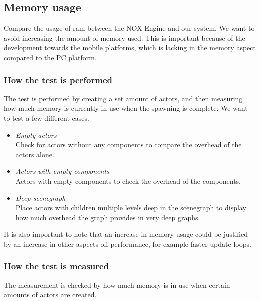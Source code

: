 \subsection{Memory usage}
Compare the usage of ram between the NOX-Engine and our system.
We want to avoid increasing the amount of memory used.
This is important because of the development towards the mobile platforms, which is lacking in the memory aspect compared to the PC platform.

\subsubsection*{How the test is performed}
The test is performed by creating a set amount of actors, and then measuring how much memory is currently in use when the spawning is complete.
We want to test a few different cases.

\begin{itemize}

    \item\noindent\textit{Empty actors}\\
    Check for actors without any components to compare the overhead of the actors alone.

    \item\noindent\textit{Actors with empty components}\\
    Actors with empty components to check the overhead of the components.

    \item\noindent\textit{Deep scenegraph}\\
    Place actors with children multiple levels deep in the scenegraph to display how much overhead the graph provides in very deep graphs.


\end{itemize}

\noindent It is also important to note that an increase in memory usage could be justified by an increase in other aspects off performance, for example faster update loops.

\subsubsection*{How the test is measured}
The measurement is checked by how much memory is in use when certain amounts of actors are created.